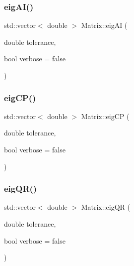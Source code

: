 \mbox{\label{class_matrix_a107beca4305d735f074f6cb6ef97dbc9}} 
\subsubsection{\texorpdfstring{eig\+A\+I()}{eigAI()}}
{\footnotesize\ttfamily std\+::vector$<$ double $>$ Matrix\+::eig\+AI (\begin{DoxyParamCaption}\item[{double}]{tolerance,  }\item[{bool}]{verbose = {\ttfamily false} }\end{DoxyParamCaption})}

\mbox{\label{class_matrix_a2df4b81dc518abc9fcd6896e2dafdff0}} 
\subsubsection{\texorpdfstring{eig\+C\+P()}{eigCP()}}
{\footnotesize\ttfamily std\+::vector$<$ double $>$ Matrix\+::eig\+CP (\begin{DoxyParamCaption}\item[{double}]{tolerance,  }\item[{bool}]{verbose = {\ttfamily false} }\end{DoxyParamCaption})}

\mbox{\label{class_matrix_adcb3d7e342e79b4d667860ffbf9811a1}} 
\subsubsection{\texorpdfstring{eig\+Q\+R()}{eigQR()}}
{\footnotesize\ttfamily std\+::vector$<$ double $>$ Matrix\+::eig\+QR (\begin{DoxyParamCaption}\item[{double}]{tolerance,  }\item[{bool}]{verbose = {\ttfamily false} }\end{DoxyParamCaption})}

\mbox{\label{class_matrix_a01b08c4fed1a9f7e80467e613cfc8c9e}} 
